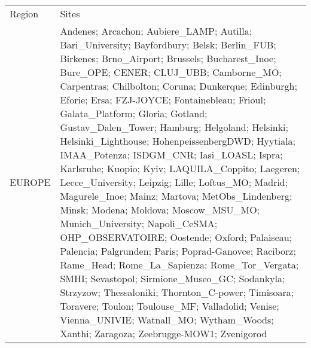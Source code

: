 \documentclass[journal abbreviation, manuscript]{copernicus}
\begin{document}
\begin{table}
 \scriptsize
 \begin{tabularx}{\textwidth}{lX}
  \tophline
  Region    & Sites                                                                                                                                                                                                                                                                                                                                                                                                                                                                                                                                                                                                                                                                                                                                                                                                                                                                                                                                                                                                                                                                                                                                                                                                                                                                                                                                                                                                                                                                                                                                                   \\
  \middlehline
  EUROPE    & Andenes; Arcachon; Aubiere\_LAMP; Autilla; Bari\_University; Bayfordbury; Belsk; Berlin\_FUB; Birkenes; Brno\_Airport; Brussels; Bucharest\_Inoe; Bure\_OPE; CENER; CLUJ\_UBB; Camborne\_MO; Carpentras; Chilbolton; Coruna; Dunkerque; Edinburgh; Eforie; Ersa; FZJ-JOYCE; Fontainebleau; Frioul; Galata\_Platform; Gloria; Gotland; Gustav\_Dalen\_Tower; Hamburg; Helgoland; Helsinki; Helsinki\_Lighthouse; HohenpeissenbergDWD; Hyytiala; IMAA\_Potenza; ISDGM\_CNR; Iasi\_LOASL; Ispra; Karlsruhe; Kuopio; Kyiv; LAQUILA\_Coppito; Laegeren; Lecce\_University; Leipzig; Lille; Loftus\_MO; Madrid; Magurele\_Inoe; Mainz; Martova; MetObs\_Lindenberg; Minsk; Modena; Moldova; Moscow\_MSU\_MO; Munich\_University; Napoli\_CeSMA; OHP\_OBSERVATOIRE; Oostende; Oxford; Palaiseau; Palencia; Palgrunden; Paris; Poprad-Ganovce; Raciborz; Rame\_Head; Rome\_La\_Sapienza; Rome\_Tor\_Vergata; SMHI; Sevastopol; Sirmione\_Museo\_GC; Sodankyla; Strzyzow; Thessaloniki; Thornton\_C-power; Timisoara; Toravere; Toulon; Toulouse\_MF; Valladolid; Venise; Vienna\_UNIVIE; Watnall\_MO; Wytham\_Woods; Xanthi; Zaragoza; Zeebrugge-MOW1; Zvenigorod                                                                                                                                                                                                                                                                                                                                                                                               \\

\end{tabularx}
\end{table}
\end{document}
